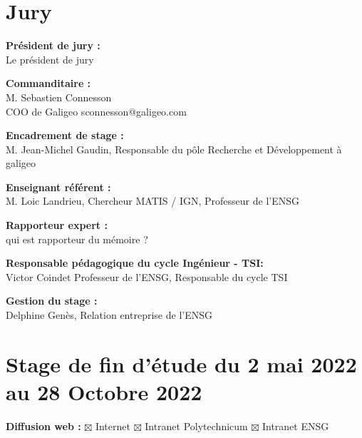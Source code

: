 \thispagestyle{plain}
\section*{Jury}
\vspace{0.5cm}

\textbf{Président de jury :} \\

Le président de jury

\vspace{0.5cm}

\textbf{Commanditaire :} \\

M. Sebastien Connesson \\
    COO de Galigeo
sconnesson@galigeo.com

\vspace{0.5cm}

\textbf{Encadrement de stage :} \\ 

M. Jean-Michel Gaudin, Responsable du pôle Recherche et Développement à galigeo

\vspace{0.5cm}

\textbf{Enseignant référent :} \\ 

M. Loic Landrieu, Chercheur MATIS / IGN, Professeur de l'ENSG

\vspace{0.5cm}

\textbf{Rapporteur expert :} \\ 

qui est rapporteur du mémoire ?

\vspace{0.5cm}

\textbf{Responsable pédagogique du cycle Ingénieur - TSI:} \\

Victor Coindet
Professeur de l'ENSG, Responsable du cycle TSI

\vspace{0.5cm}

\textbf{Gestion du stage :} \\ 

Delphine Genès, Relation entreprise de l'ENSG

\vspace{0.5cm}


\section*{Stage de fin d'étude du 2 mai 2022 au 28 Octobre 2022}
\vspace{0.3cm}
\textbf{Diffusion web :} $\boxtimes$ Internet \hspace{0.2cm}$\boxtimes$ Intranet Polytechnicum\hspace{0.2cm}
$\boxtimes$ Intranet ENSG\vspace{0.3cm}

